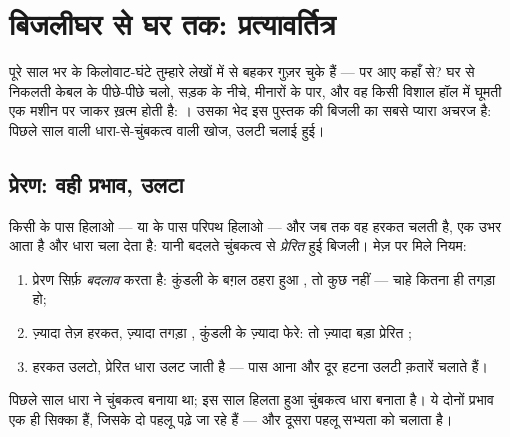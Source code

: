 \chapter{बिजलीघर से घर तक: प्रत्यावर्तित्र}\label{ch:g9:alternator}

पूरे साल भर के किलोवाट-घंटे तुम्हारे लेखों में से बहकर गुज़र चुके हैं
--- पर आए कहाँ से? घर से निकलती केबल के पीछे-पीछे चलो, सड़क के नीचे,
मीनारों के पार, और वह किसी विशाल हॉल में घूमती एक मशीन पर जाकर ख़त्म
होती है: । उसका भेद इस पुस्तक की बिजली का सबसे प्यारा
अचरज है: पिछले साल वाली धारा-से-चुंबकत्व वाली खोज, उलटी चलाई हुई।

\section{प्रेरण: वही प्रभाव, उलटा}

\begin{proposition}[विद्युतचुंबकीय प्रेरण]\label{prop:g9:alternator:induction}
किसी  के पास  हिलाओ --- या  के पास परिपथ हिलाओ ---
और जब तक वह हरकत चलती है, एक  उभर आता है और धारा चला देता है:
यानी बदलते चुंबकत्व से \emph{प्रेरित} हुई बिजली। मेज़ पर मिले नियम:
\begin{enumerate}
  \item प्रेरण सिर्फ़ \emph{बदलाव} करता है: कुंडली के बग़ल ठहरा हुआ
        , तो कुछ नहीं ---  चाहे कितना ही तगड़ा हो;
  \item ज़्यादा तेज़ हरकत, ज़्यादा तगड़ा , कुंडली के ज़्यादा
        फेरे: तो ज़्यादा बड़ा प्रेरित ;
  \item हरकत उलटो, प्रेरित धारा उलट जाती है --- पास आना और दूर हटना
        उलटी क़तारें चलाते हैं।
\end{enumerate}
पिछले साल धारा ने चुंबकत्व बनाया था; इस साल हिलता हुआ चुंबकत्व धारा
बनाता है। ये दोनों प्रभाव एक ही सिक्का हैं, जिसके दो पहलू पढ़े जा रहे
हैं --- और दूसरा पहलू सभ्यता को चलाता है।
\end{proposition}

